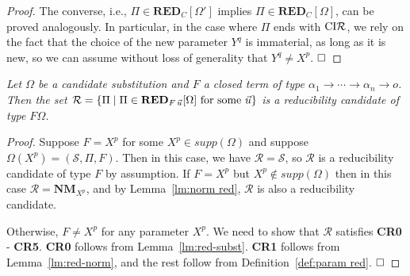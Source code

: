 \documentclass[preprint]{elsarticle}
\def\Rscr{{\mathcal R}}
\def\Sscr{{\mathcal S}}
\newcommand{\coindR}{{\rm CI}{\cal R}}
\newcommand{\ra}{\to}
\def\RED{{\mathbf{RED}}}
\def\NM{{\mathbf{NM}}}
\def\qed{$\hfill\Box$}
\newenvironment{lemmacp}[1]{\noindent {\bf Lemma~\ref{#1}.} \em}{}
\begin{document}
\begin{proof}
The converse, i.e., $\Pi \in \RED_C[\Omega']$
implies $\Pi \in \RED_C[\Omega]$, can be proved analogously.
In particular, in the case where $\Pi$ ends with $\coindR$,
we rely on the fact that the choice of the new parameter
$Y^q$ is immaterial, as long as it is new, so
we can assume without loss of generality that $Y^q \not = X^p$. 
\qed
\end{proof}

\begin{lemmacp}{lm:red candidate}
  Let $\Omega$ be a candidate substitution and $F$  a closed term of
  type $\alpha_1 \ra \cdots \ra \alpha_n \ra
  o$. Then the set
$ 
\Rscr = \{\Pi \mid \Pi \in \RED_{F\,\vec u}[\Omega] \ \hbox{for some
  $\vec u$} \} 
$
is a reducibility candidate of type $F\Omega$.
\end{lemmacp}
\begin{proof}
  Suppose $F = X^p$ for some $X^p \in supp(\Omega)$ and suppose
  $\Omega(X^p) = (\Sscr, \Pi, F)$.  Then in this case, we have $\Rscr
  = \Sscr$, so $\Rscr$ is a reducibility candidate of type $F$ by
  assumption.  If $F = X^p$ but $X^p \not \in supp(\Omega)$ then in
  this case $\Rscr = \NM_{X^p}$, and by Lemma~\ref{lm:norm red},
  $\Rscr$ is also a reducibility candidate.

  Otherwise, $F \not = X^p$ for any parameter $X^p$.  We need to show
  that $\Rscr$ satisfies {\bf CR0} - {\bf CR5}.  {\bf CR0} follows
  from Lemma~\ref{lm:red-subst}.  {\bf CR1} follows from
  Lemma~\ref{lm:red-norm}, and the rest follow from
  Definition~\ref{def:param red}.  \qed
\end{proof}
\end{document}
